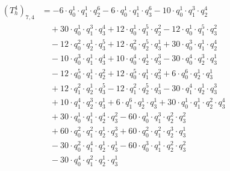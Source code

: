 \begin{align*}(T_{h}^4)_{7,4}&=-6\cdot q_0^{1}\cdot q_1^{1}\cdot q_2^{6}-6\cdot q_0^{1}\cdot q_1^{1}\cdot q_3^{6}-10\cdot q_0^{1}\cdot q_1^{3}\cdot q_2^{4}\\
&\quad +30\cdot q_0^{1}\cdot q_1^{3}\cdot q_3^{4}+12\cdot q_0^{1}\cdot q_1^{5}\cdot q_2^{2}-12\cdot q_0^{1}\cdot q_1^{5}\cdot q_3^{2}\\
&\quad -12\cdot q_0^{2}\cdot q_2^{1}\cdot q_3^{5}+12\cdot q_0^{2}\cdot q_2^{5}\cdot q_3^{1}+30\cdot q_0^{3}\cdot q_1^{1}\cdot q_2^{4}\\
&\quad -10\cdot q_0^{3}\cdot q_1^{1}\cdot q_3^{4}+10\cdot q_0^{4}\cdot q_2^{1}\cdot q_3^{3}-30\cdot q_0^{4}\cdot q_2^{3}\cdot q_3^{1}\\
&\quad -12\cdot q_0^{5}\cdot q_1^{1}\cdot q_2^{2}+12\cdot q_0^{5}\cdot q_1^{1}\cdot q_3^{2}+6\cdot q_0^{6}\cdot q_2^{1}\cdot q_3^{1}\\
&\quad +12\cdot q_1^{2}\cdot q_2^{1}\cdot q_3^{5}-12\cdot q_1^{2}\cdot q_2^{5}\cdot q_3^{1}-30\cdot q_1^{4}\cdot q_2^{1}\cdot q_3^{3}\\
&\quad +10\cdot q_1^{4}\cdot q_2^{3}\cdot q_3^{1}+6\cdot q_1^{6}\cdot q_2^{1}\cdot q_3^{1}+30\cdot q_0^{1}\cdot q_1^{1}\cdot q_2^{2}\cdot q_3^{4}\\
&\quad +30\cdot q_0^{1}\cdot q_1^{1}\cdot q_2^{4}\cdot q_3^{2}-60\cdot q_0^{1}\cdot q_1^{3}\cdot q_2^{2}\cdot q_3^{2}\\
&\quad +60\cdot q_0^{2}\cdot q_1^{2}\cdot q_2^{1}\cdot q_3^{3}+60\cdot q_0^{2}\cdot q_1^{2}\cdot q_2^{3}\cdot q_3^{1}\\
&\quad -30\cdot q_0^{2}\cdot q_1^{4}\cdot q_2^{1}\cdot q_3^{1}-60\cdot q_0^{3}\cdot q_1^{1}\cdot q_2^{2}\cdot q_3^{2}\\
&\quad -30\cdot q_0^{4}\cdot q_1^{2}\cdot q_2^{1}\cdot q_3^{1}\end{align*}
